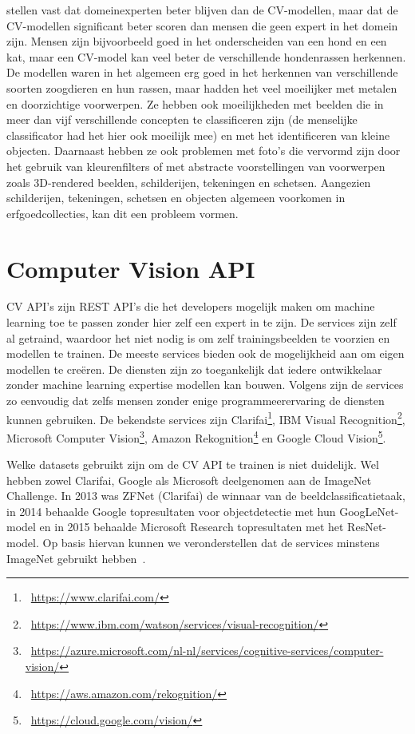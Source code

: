 \textcite{Russakovsky2014} stellen vast dat domeinexperten beter blijven dan de CV-modellen, maar dat de CV-modellen significant beter scoren dan mensen die geen expert in het domein zijn. Mensen zijn bijvoorbeeld goed in het onderscheiden van een hond en een kat, maar een CV-model kan veel beter de verschillende hondenrassen herkennen. De modellen waren in het algemeen erg goed in het herkennen van verschillende soorten zoogdieren en hun rassen, maar hadden het veel moeilijker met metalen en doorzichtige voorwerpen. Ze hebben ook moeilijkheden met beelden die in meer dan vijf verschillende concepten te classificeren zijn (de menselijke classificator had het hier ook moeilijk mee) en met het identificeren van kleine  objecten. Daarnaast hebben ze ook problemen met foto’s die vervormd zijn door het gebruik van kleurenfilters  of met abstracte voorstellingen van voorwerpen zoals 3D-rendered beelden, schilderijen, tekeningen en schetsen. Aangezien schilderijen, tekeningen, schetsen en objecten algemeen voorkomen in erfgoedcollecties, kan dit een probleem vormen.

\section{Computer Vision API}
\label{sec:CV-API}


CV API’s zijn REST API’s die het developers mogelijk maken om machine learning toe te passen zonder hier zelf een expert in te zijn.  De services zijn zelf al getraind, waardoor het niet nodig is om zelf trainingsbeelden te voorzien en modellen te trainen. De meeste services bieden ook de mogelijkheid aan om eigen modellen te cre\"{e}ren. De diensten zijn zo toegankelijk dat iedere ontwikkelaar zonder machine learning expertise modellen kan bouwen. Volgens \textcite{Lardinois2018} zijn de services zo eenvoudig dat zelfs mensen zonder enige programmeerervaring de diensten kunnen gebruiken. De bekendste services zijn Clarifai\footnote{~\url{https://www.clarifai.com/}}, IBM Visual Recognition\footnote{~\url{https://www.ibm.com/watson/services/visual-recognition/}}, Microsoft Computer Vision\footnote{~\url{https://azure.microsoft.com/nl-nl/services/cognitive-services/computer-vision/}}, Amazon Rekognition\footnote{~\url{https://aws.amazon.com/rekognition/}} en Google Cloud Vision\footnote{~\url{https://cloud.google.com/vision/}}. 

Welke datasets gebruikt zijn om de CV API te trainen is niet duidelijk. Wel hebben zowel Clarifai, Google als Microsoft deelgenomen aan de ImageNet Challenge. In 2013 was ZFNet (Clarifai) de winnaar van de beeldclassificatietaak, in 2014 behaalde Google topresultaten voor objectdetectie met hun GoogLeNet-model en in 2015 behaalde Microsoft Research topresultaten met het ResNet-model. Op basis hiervan kunnen we veronderstellen dat de services minstens ImageNet gebruikt hebben~\autocite{Brownlee2019a}.

